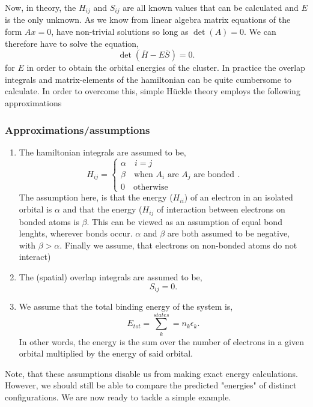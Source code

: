 Now, in theory, the $H_{ij}$ and $S_{ij}$ are all known values that can be calculated and $E$ is the only unknown. As we know from linear algebra matrix equations of the form $Ax = 0$, have non-trivial solutions so long as $\det\left( A \right) = 0 $. We can therefore have to solve the equation,
\[
    \det\left( \overline{H} - E \overline{S} \right) = 0
.\] 
for $E$ in order to obtain the orbital energies of the cluster. In practice the overlap integrals and matrix-elements of the hamiltonian can be quite cumbersome to calculate. In order to overcome this, simple Hückle theory employs the following approximations
\subsubsection{Approximations/assumptions}
\begin{enumerate}
    \item The hamiltonian integrals are assumed to be,
        \[
        H_{ij} = \begin{cases}
            \alpha \quad i = j \\
            \beta \quad \text{when $A_i$ are  $A_j$ are bonded} \\
            0 \quad \text{otherwise}
        \end{cases}
        .\] 
        The assumption here, is that the energy ($H_{ii}$) of an electron in an isolated orbital is $\alpha$ and that the energy ($H_{ij}$ of interaction between electrons on bonded atoms is $\beta$. This can be viewed as an assumption of equal bond lenghts, wherever bonds occur. $\alpha$ and $\beta$ are both assumed to be negative, with $\beta > \alpha$. Finally we assume, that electrons on non-bonded atoms do not interact)
    \item The (spatial) overlap integrals are assumed to be,
        \[
        S_{ij} = 0
        .\]
    \item We assume that the total binding energy of the system is,
        \[
        E_{tot}= \sum_k^{states} = n_k \epsilon_k
        .\] 
        In other words, the energy is the sum over the number of electrons in a given orbital multiplied by the energy of said orbital. 
\end{enumerate}
Note, that these assumptions disable us from making exact energy calculations. However, we should still be able to compare the predicted "energies" of distinct configurations. We are now ready to tackle a simple example.
